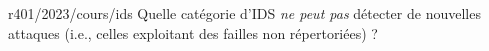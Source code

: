 \begin{question}{r401/2023/cours/ids}
  Quelle catégorie d'IDS {\em ne peut pas} détecter de nouvelles
  attaques (i.e., celles exploitant des failles non répertoriées) ?
  \begin{reponseshoriz}
  \end{reponseshoriz}
\end{question}
